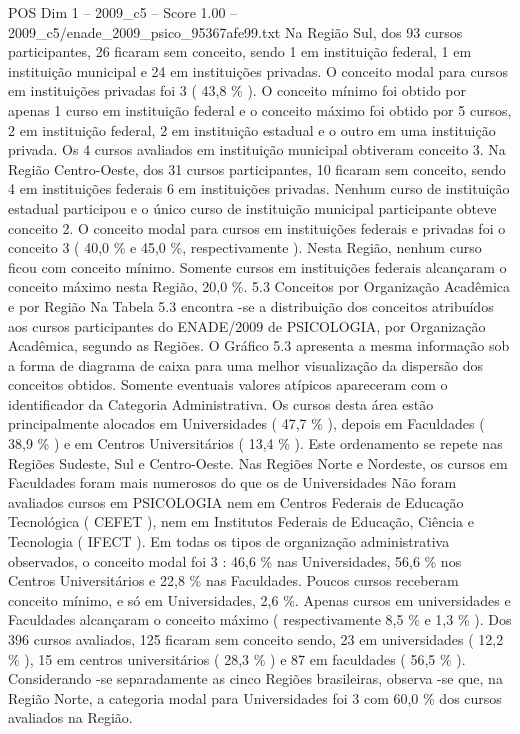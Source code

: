 \begin{textsample}{POS Dim 1 – 2009\_c5 – Score 1.00 – 2009\_c5/enade\_2009\_psico\_95367afe99.txt}
Na Região Sul, dos 93 cursos participantes, 26 ficaram sem conceito, sendo 1 em instituição federal, 1 em instituição municipal e 24 em instituições privadas.
O conceito modal para cursos em instituições privadas foi 3 ( 43,8 \% ).
O conceito mínimo foi obtido por apenas 1 curso em instituição federal e o conceito máximo foi obtido por 5 cursos, 2 em instituição federal, 2 em instituição estadual e o outro em uma instituição privada.
Os 4 cursos avaliados em instituição municipal obtiveram conceito 3.
Na Região Centro-Oeste, dos 31 cursos participantes, 10 ficaram sem conceito, sendo 4 em instituições federais 6 em instituições privadas.
Nenhum curso de instituição estadual participou e o único curso de instituição municipal participante obteve conceito 2.
O conceito modal para cursos em instituições federais e privadas foi o conceito 3 ( 40,0 \% e 45,0 \%, respectivamente ).
Nesta Região, nenhum curso ficou com conceito mínimo.
Somente cursos em instituições federais alcançaram o conceito máximo nesta Região, 20,0 \%. 5.3 Conceitos por Organização Acadêmica e por Região Na Tabela 5.3 encontra -se a distribuição dos conceitos atribuídos aos cursos participantes do ENADE/2009 de PSICOLOGIA, por Organização Acadêmica, segundo as Regiões.
O Gráfico 5.3 apresenta a mesma informação sob a forma de diagrama de caixa para uma melhor visualização da dispersão dos conceitos obtidos.
Somente eventuais valores atípicos apareceram com o identificador da Categoria Administrativa.
Os cursos desta área estão principalmente alocados em Universidades ( 47,7 \% ), depois em Faculdades ( 38,9 \% ) e em Centros Universitários ( 13,4 \% ).
Este ordenamento se repete nas Regiões Sudeste, Sul e Centro-Oeste.
Nas Regiões Norte e Nordeste, os cursos em Faculdades foram mais numerosos do que os de Universidades Não foram avaliados cursos em PSICOLOGIA nem em Centros Federais de Educação Tecnológica ( CEFET ), nem em Institutos Federais de Educação, Ciência e Tecnologia ( IFECT ).
Em todas os tipos de organização administrativa observados, o conceito modal foi 3 : 46,6 \% nas Universidades, 56,6 \% nos Centros Universitários e 22,8 \% nas Faculdades.
Poucos cursos receberam conceito mínimo, e só em Universidades, 2,6 \%.
Apenas cursos em universidades e Faculdades alcançaram o conceito máximo ( respectivamente 8,5 \% e 1,3 \% ).
Dos 396 cursos avaliados, 125 ficaram sem conceito sendo, 23 em universidades ( 12,2 \% ), 15 em centros universitários ( 28,3 \% ) e 87 em faculdades ( 56,5 \% ).
Considerando -se separadamente as cinco Regiões brasileiras, observa -se que, na Região Norte, a categoria modal para Universidades foi 3 com 60,0 \% dos cursos avaliados na Região.

\end{textsample}

